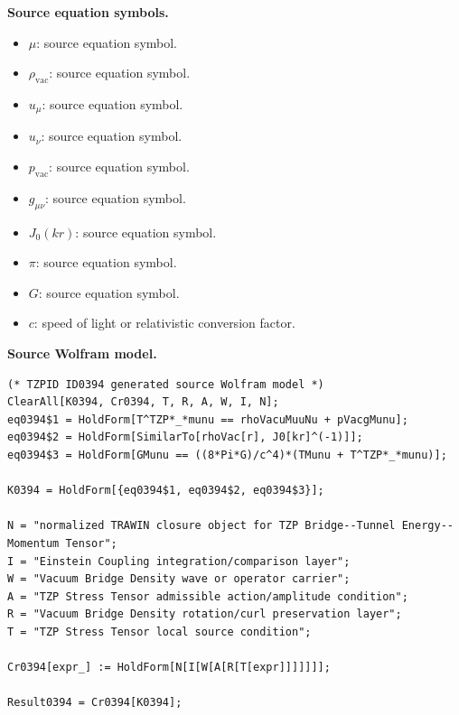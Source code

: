 \begin{minipage}[t]{0.49\linewidth}
\begingroup
\small
\raggedright
\textbf{Source equation symbols.}\par
\begin{itemize}[leftmargin=1.35em,itemsep=1pt,topsep=1pt,parsep=0pt]
    \item $\mu$: source equation symbol.
    \item $\rho_{\mathrm{vac}}$: source equation symbol.
    \item $u_{\mu}$: source equation symbol.
    \item $u_{\nu}$: source equation symbol.
    \item $p_{\mathrm{vac}}$: source equation symbol.
    \item $g_{\mu\nu}$: source equation symbol.
    \item $J_{0}(kr)$: source equation symbol.
    \item $\pi$: source equation symbol.
    \item $G$: source equation symbol.
    \item $c$: speed of light or relativistic conversion factor.
\end{itemize}
\endgroup
\end{minipage}\hfill
\begin{minipage}[t]{0.47\linewidth}
\begingroup
\scriptsize
\raggedright
\textbf{Source Wolfram model.}\par
\begin{Verbatim}[fontsize=\tiny,breaklines=true,breakanywhere=true]
(* TZPID ID0394 generated source Wolfram model *)
ClearAll[K0394, Cr0394, T, R, A, W, I, N];
eq0394$1 = HoldForm[T^TZP*_*munu == rhoVacuMuuNu + pVacgMunu];
eq0394$2 = HoldForm[SimilarTo[rhoVac[r], J0[kr]^(-1)]];
eq0394$3 = HoldForm[GMunu == ((8*Pi*G)/c^4)*(TMunu + T^TZP*_*munu)];

K0394 = HoldForm[{eq0394$1, eq0394$2, eq0394$3}];

N = "normalized TRAWIN closure object for TZP Bridge--Tunnel Energy--Momentum Tensor";
I = "Einstein Coupling integration/comparison layer";
W = "Vacuum Bridge Density wave or operator carrier";
A = "TZP Stress Tensor admissible action/amplitude condition";
R = "Vacuum Bridge Density rotation/curl preservation layer";
T = "TZP Stress Tensor local source condition";

Cr0394[expr_] := HoldForm[N[I[W[A[R[T[expr]]]]]]];

Result0394 = Cr0394[K0394];
\end{Verbatim}
\endgroup
\end{minipage}

